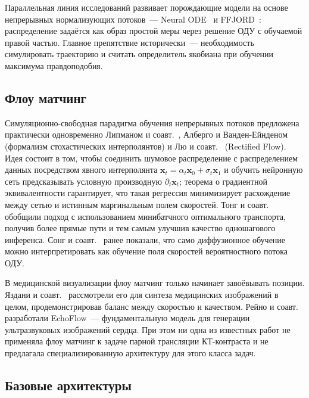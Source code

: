 Параллельная линия исследований развивает порождающие модели на основе непрерывных нормализующих потоков~--- Neural ODE~\cite{chen2018neural} и FFJORD~\cite{grathwohl2018ffjord}: распределение задаётся как образ простой меры через решение ОДУ с обучаемой правой частью. Главное препятствие исторически~--- необходимость симулировать траекторию и считать определитель якобиана при обучении максимума правдоподобия.

\subsection{Флоу матчинг}

Симуляционно-свободная парадигма обучения непрерывных потоков предложена практически одновременно Липманом и соавт.~\cite{lipman2022flow}, Алберго и Ванден-Ейнденом~\cite{albergo2022building} (формализм стохастических интерполянтов) и Лю и соавт.~\cite{liu2022flow} (Rectified Flow). Идея состоит в том, чтобы соединить шумовое распределение с распределением данных посредством явного интерполянта $\mathbf{x}_t=\alpha_t\mathbf{x}_0+\sigma_t\mathbf{x}_1$ и обучить нейронную сеть предсказывать условную производную $\partial_t\mathbf{x}_t$; теорема о градиентной эквивалентности гарантирует, что такая регрессия минимизирует расхождение между сетью и истинным маргинальным полем скоростей. Тонг и соавт.~\cite{tong2023improving} обобщили подход с использованием минибатчного оптимального транспорта, получив более прямые пути и тем самым улучшив качество одношагового инференса. Сонг и соавт.~\cite{song2020score} ранее показали, что само диффузионное обучение можно интерпретировать как обучение поля скоростей вероятностного потока ОДУ.

В медицинской визуализации флоу матчинг только начинает завоёвывать позиции. Яздани и соавт.~\cite{yazdani2025flow} рассмотрели его для синтеза медицинских изображений в целом, продемонстрировав баланс между скоростью и качеством. Рейно и соавт.~\cite{reynaud2025echoflow} разработали EchoFlow~--- фундаментальную модель для генерации ультразвуковых изображений сердца. При этом ни одна из известных работ не применяла флоу матчинг к задаче парной трансляции КТ-контраста и не предлагала специализированную архитектуру для этого класса задач.

\subsection{Базовые архитектуры}

